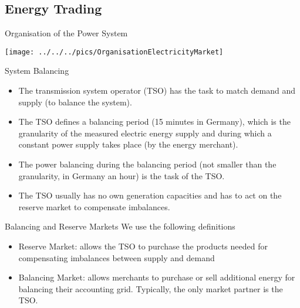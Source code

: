 


\subsection{Energy Trading}


{Organisation of the Power System}
\begin{center}
\texttt{[image: ../../../pics/OrganisationElectricityMarket]}
\end{center}






{System Balancing}
\begin{itemize}
\item<1-> The transmission system operator (TSO) has the task to match demand and supply (to balance the system).
\item<2-> The TSO defines a balancing period (15 minutes in Germany), which is the granularity of the measured electric energy supply and during which a constant power supply takes place (by the energy merchant).
\item<3->  The power balancing during the balancing period (not smaller than the granularity, in Germany an hour) is the task of the TSO.
\item<4-> The TSO usually has no own generation capacities and has to act on the reserve market to compensate imbalances.
\end{itemize}



{Balancing and Reserve Markets}
We use the following definitions
\begin{itemize}
\item<1-> Reserve Market: allows the TSO to purchase the products needed for compensating imbalances between supply and demand
\item<2->  Balancing Market: allows merchants to purchase or sell additional energy for balancing their accounting grid. Typically, the only market partner is the TSO.
\end{itemize}



